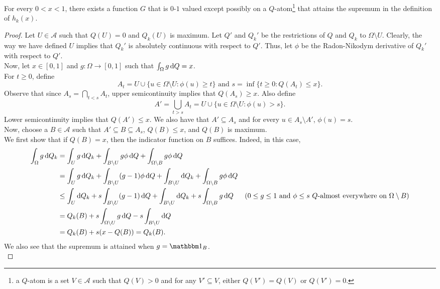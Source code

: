 \begin{lemma}
\label{hk distance supremum attained}
	For every $0<x<1$, there exists a function $G$ that is $0$-$1$ valued except possibly on a $Q$-atom\footnote{a $Q$-atom is a set $V\in\mathcal{A}$ such that $Q(V)>0$ and for any $V'\subseteq V$, either $Q(V')=Q(V)$ or $Q(V')=0$.} that attains the supremum in the definition of $h_k(x)$.
\end{lemma}
\begin{proof}
	Let $U\in\mathcal{A}$ such that $Q(U)=0$ and $Q_k(U)$ is maximum. Let $Q'$ and $Q_k'$ be the restrictions of $Q$ and $Q_k$ to $\Omega\setminus U$. Clearly, the way we have defined $U$ implies that $Q_k'$ is absolutely continuous with respect to $Q'$. Thus, let $\phi$ be the Radon-Nikodym derivative of $Q_k'$ with respect to $Q'$.\\
	Now, let $x\in[0,1]$ and $g:\Omega\to[0,1]$ such that $\int_\Omega g\operatorname{d}\!{Q} = x$.\\
	For $t\geq 0$, define
	\[ A_t = U \cup \{u \in \Omega\setminus U : \phi(u) \geq t\}\text{ and }s=\inf\{t\geq 0 : Q(A_t) \leq x\}. \]
	Observe that since $A_s = \bigcap_{t<s}A_t$, upper semicontinuity implies that $Q(A_s)\geq x$. Also define
	\[ A' = \bigcup_{t>s} A_t = U \cup \{u \in \Omega\setminus U : \phi(u) > s\}. \]
	Lower semicontinuity implies that $Q(A')\leq x$. We also have that $A'\subseteq A_s$ and for every $u\in A_s\setminus A'$, $\phi(u)=s$.\\
	Now, choose a $B\in\mathcal{A}$ such that $A'\subseteq B\subseteq A_s$, $Q(B)\leq x$, and $Q(B)$ is maximum.\\
	We first show that if $Q(B)=x$, then the indicator function on $B$ suffices. Indeed, in this case,
	\begin{align*}
		\int_\Omega g\d{Q}_k &= \int_U g\d{Q}_k + \int_{B\setminus U} g\phi\d{Q} + \int_{\Omega\setminus B} g\phi\d{Q} \\
		&= \int_U g\d{Q}_k + \int_{B\setminus U} (g-1)\phi\d{Q} + \int_{B\setminus U} \d{Q}_k + \int_{\Omega\setminus B} g\phi\d{Q} \\
		&\leq \int_U \d{Q}_k + s\int_{B\setminus U} (g-1)\d{Q} + \int_{B\setminus U} \d{Q}_k + s\int_{\Omega\setminus B} g \d{Q} & \text{($0\leq g\leq 1$ and $\phi\leq s$ $Q$-almost everywhere on $\Omega\setminus B$)} \\
		&= Q_k(B) + s\int_{\Omega\setminus U} g\d{Q} - s\int_{B\setminus U}\d{Q} \\
		&= Q_k(B) + s(x - Q(B)) = Q_k(B).
	\end{align*}
	We also see that the supremum is attained when $g=\indic_B$.\\

\end{proof}
